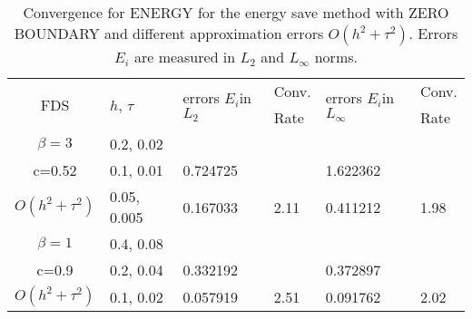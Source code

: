 \documentclass{article}
\begin{document}
\begin{table}[ht]
\centering
\small
		\begin{tabular}{||c|l|ll|ll||}
			\hline
			\hline
      \multirow{2  }{*}{FDS}        & \multirow{2  }{*}{$h$, $\tau$}  & \multirow{2  }{*}{errors $E_i$in$L_2$}  &Conv.& \multirow{2  }{*}{errors $E_i$in$L_\infty$}  &Conv.  \\
	                                        &                                                     &                                                                 &  Rate &                                                                       & Rate \\
   			\hline 
					\hline 
  $\beta=3$                &0.2, 0.02         &                    &                &                  &                   \\
   c=0.52                     &0.1, 0.01         & 0.724725   &                & 1.622362  &                   \\
     $O(h^2 + \tau^ 2)$ &0.05, 0.005  & 0.167033   & 2.11       & 0.411212   & 1.98   \\
	   \hline
			\hline 
       $\beta=1$           & 0.4, 0.08       &                   &           &                 &   \\
                  c=0.9       & 0.2, 0.04        & 0.332192   &          &0.372897  &   \\
  $O(h^2+ \tau^2)$  & 0.1, 0.02       & 0.057919   & 2.51  &0.091762  & 2.02  \\
	   \hline
			\hline 
		\end{tabular}
		\caption{ Convergence for ENERGY for the energy save method with ZERO BOUNDARY and different approximation errors $O(h^{2} + \tau^2 )$. Errors $E_i$ are measured in $L_2$ and $L_\infty$ norms. }
\label{tableB}
\end{table}
\end{document}
